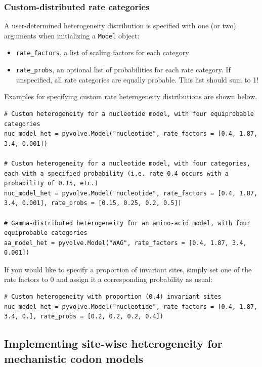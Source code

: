 \documentclass{article}
\newcommand{\code}[1]{\texttt{\small{#1}}}
\begin{document}
\subsubsection{Custom-distributed rate categories}

A user-determined heterogeneity distribution is specified with one (or two) arguments when initializing a \code{Model} object:
\begin{itemize}
	\item \code{rate\_factors}, a list of scaling factors for each category
	\item \code{rate\_probs}, an optional list of probabilities for each rate category. If unspecified, all rate categories are equally probable. This list should sum to 1!
\end{itemize}

Examples for specifying custom rate heterogeneity distributions are shown below.
\begin{lstlisting}
# Custom heterogeneity for a nucleotide model, with four equiprobable categories
nuc_model_het = pyvolve.Model("nucleotide", rate_factors = [0.4, 1.87, 3.4, 0.001])

# Custom heterogeneity for a nucleotide model, with four categories, each with a specified probability (i.e. rate 0.4 occurs with a probability of 0.15, etc.)
nuc_model_het = pyvolve.Model("nucleotide", rate_factors = [0.4, 1.87, 3.4, 0.001], rate_probs = [0.15, 0.25, 0.2, 0.5])

# Gamma-distributed heterogeneity for an amino-acid model, with four equiprobable categories
aa_model_het = pyvolve.Model("WAG", rate_factors = [0.4, 1.87, 3.4, 0.001])
\end{lstlisting}


If you would like to specify a proportion of invariant sites, simply set one of the rate factors to 0 and assign it a corresponding probability as usual:
\begin{lstlisting}
# Custom heterogeneity with proportion (0.4) invariant sites
nuc_model_het = pyvolve.Model("nucleotide", rate_factors = [0.4, 1.87, 3.4, 0.], rate_probs = [0.2, 0.2, 0.2, 0.4])
\end{lstlisting}


 
\subsection{Implementing site-wise heterogeneity for mechanistic codon models}\label{sec:sitehet_codon}
\end{document}
